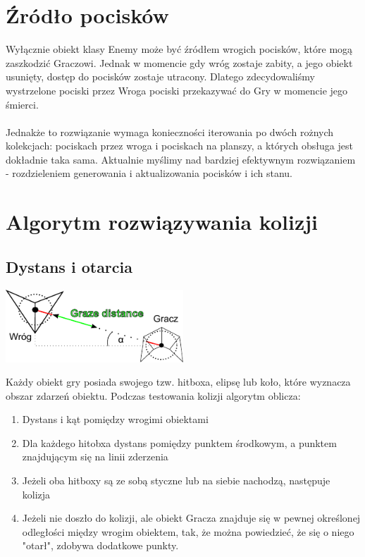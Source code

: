 \documentclass[a4paper,twoside]{article}
\begin{document}
		\section{Źródło pocisków}
			Wyłącznie obiekt klasy Enemy może być źródłem wrogich pocisków, które mogą zaszkodzić Graczowi. Jednak w momencie gdy wróg zostaje zabity, a jego obiekt usunięty, dostęp do pocisków zostaje utracony. Dlatego zdecydowaliśmy wystrzelone pociski przez Wroga pociski przekazywać do Gry w momencie jego śmierci.\\\\
			Jednakże to rozwiązanie wymaga konieczności iterowania po dwóch rożnych kolekcjach: pociskach przez wroga i pociskach na planszy, a których obsługa jest dokładnie taka sama. Aktualnie myślimy nad bardziej efektywnym rozwiązaniem - rozdzieleniem generowania i aktualizowania pocisków i ich stanu.
	
	
		\section{Algorytm rozwiązywania kolizji}
			\subsection{Dystans i otarcia}
				\begin{center}
					\includegraphics[width=0.5\textwidth]{./images/kolizje01}
				\end{center}
				Każdy obiekt gry posiada swojego tzw. hitboxa, elipsę lub koło, które wyznacza obszar zdarzeń obiektu. Podczas testowania kolizji algorytm oblicza:
				\begin{enumerate}
					\item Dystans i kąt pomiędzy wrogimi obiektami
					\item Dla każdego hitobxa dystans pomiędzy punktem środkowym, a punktem znajdującym się na linii zderzenia
					\item Jeżeli oba hitboxy są ze sobą styczne lub na siebie nachodzą, następuje kolizja
					\item Jeżeli nie doszło do kolizji, ale obiekt Gracza znajduje się w pewnej określonej odległości między wrogim obiektem, tak, że można powiedzieć, że się o niego "otarł", zdobywa dodatkowe punkty.
				\end{enumerate}
\end{document}
